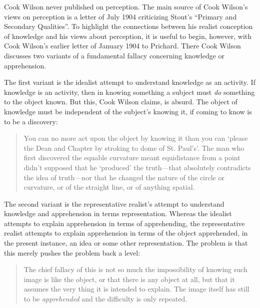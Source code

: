 Cook Wilson never published on perception. The main source of Cook Wilson's \citeyearpar[764--800]{Cook-Wilson:1926sf} views on perception is a letter of July 1904 criticizing Stout's \citeyearpar{Stout:1903zl} ``Primary and Secondary Qualities''. To highlight the connections between his realist conception of knowledge and his views about perception, it is useful to begin, however, with Cook Wilson's \citeyearpar[801--808]{Cook-Wilson:1926sf} earlier letter of January 1904 to Prichard. There Cook Wilson discusses two variants of a fundamental fallacy concerning knowledge or apprehension.

The first variant is the idealist attempt to understand knowledge as an activity. If knowledge is an activity, then in knowing something a subject must \emph{do} something to the object known. But this, Cook Wilson claims, is absurd. The object of knowledge must be independent of the subject's knowing it, if coming to know is to be a discovery: 
\begin{quote}
	You can no more act upon the object by knowing it than you can `please the Dean and Chapter by stroking to dome of St. Paul's'. The man who first discovered the equable curvature meant equidistance from a point didn't supposed that he `produced' the truth---that absolutely contradicts the idea of truth---nor that he changed the nature of the circle or curvature, or of the straight line, or of anything spatial. \citep[802]{Cook-Wilson:1926sf}
\end{quote}

The second variant is the representative realist's attempt to understand knowledge and apprehension in terms representation. Whereas the idealist attempts to explain apprehension in terms of apprehending, the representative realist attempts to explain apprehension in terms of the object apprehended, in the present instance, an idea or some other representation. The problem is that this merely pushes the problem back a level:
\begin{quote}
	The chief fallacy of this is not so much the impossibility of knowing such image is like the object, or that there is any object at all, but that it assumes the very thing it is intended to explain. The image itself has still to be \emph{apprehended} and the difficulty is only repeated. \citep[803]{Cook-Wilson:1926sf}
\end{quote}

